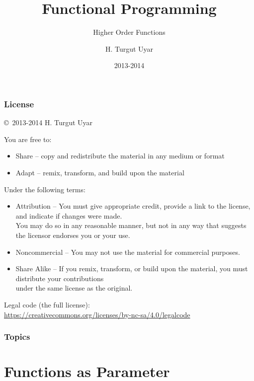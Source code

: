 \documentclass[dvipsnames]{beamer}
\title{Functional Programming}
\subtitle{Higher Order Functions}
\author{H. Turgut Uyar}
\date{2013-2014}
\theoremstyle{plain}
\begin{document}

\begin{frame}
  \titlepage
\end{frame}

\begin{frame}
  \frametitle{License}

  \hfill
  \copyright~2013-2014 H. Turgut Uyar

  \vfill
  \begin{tiny}
    You are free to:
    \begin{itemize}
      \item Share -- copy and redistribute the material in any medium or format
      \item Adapt -- remix, transform, and build upon the material
    \end{itemize}

    Under the following terms:
    \begin{itemize}
      \item Attribution -- You must give appropriate credit, provide a link to
        the license, and indicate if changes were made.\\
        You may do so in any reasonable manner, but not in any way
        that suggests the licensor endorses you or your use.

      \item Noncommercial -- You may not use the material for commercial
        purposes.

      \item Share Alike -- If you remix, transform, or build upon the material,
        you must distribute your contributions\\
        under the same license as the original.
    \end{itemize}
  \end{tiny}

  \vfill
  \begin{small}
    Legal code (the full license):\\
    \url{https://creativecommons.org/licenses/by-nc-sa/4.0/legalcode}
  \end{small}
\end{frame}

\begin{frame}
  \frametitle{Topics}
  \tableofcontents
\end{frame}

\section{Functions as Parameter}
\end{document}
